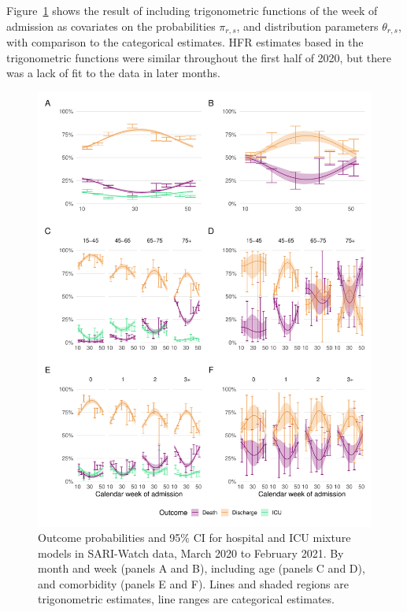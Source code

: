 Figure~\ref{fig:cyclic-regression} shows the result of including trigonometric functions of the week of admission as covariates on the probabilities $\pi_{r,s}$, and distribution parameters $\theta_{r,s}$, with comparison to the categorical estimates. HFR estimates based in the trigonometric functions were similar throughout the first half of 2020, but there was a lack of fit to the data in later months.

\begin{figure}[htbp!]
    \centering
    \includegraphics[width=\textwidth]{sari_weekly_prob.pdf}
    \caption[Outcome probabilities for hospital and ICU mixture models with categorical month and trigonometric week parameters in SARI-Watch data, March 2020 to February 2021]{Outcome probabilities and 95\% CI for hospital and ICU mixture models in SARI-Watch data, March 2020 to February 2021. By month and week (panels A and B), including age (panels C and D), and comorbidity (panels E and F). Lines and shaded regions are trigonometric estimates, line ranges are categorical estimates.}\label{fig:cyclic-regression}
\end{figure}

